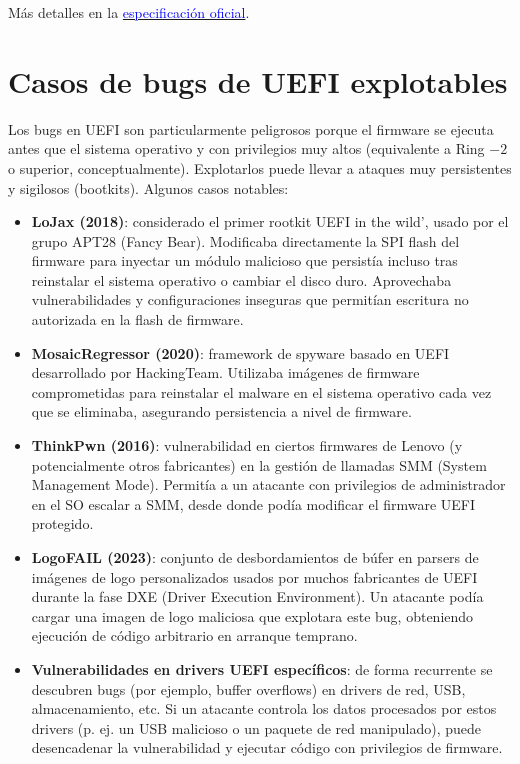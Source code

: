 \noindent Más detalles en la
\href{https://uefi.org/specs/UEFI/2.10/08_Services_Runtime_Services.html}%
      {\textcolor{blue}{especificación oficial}}.

\newpage

\section{Casos de bugs de UEFI explotables}
Los bugs en UEFI son particularmente peligrosos porque el firmware se ejecuta antes que el sistema operativo y con privilegios muy altos (equivalente a Ring $-2$ o superior, conceptualmente). Explotarlos puede llevar a ataques muy persistentes y sigilosos (bootkits). Algunos casos notables:

\begin{itemize}[noitemsep]
  \item \textbf{LoJax (2018)}: considerado el primer rootkit UEFI in the wild', usado por el grupo APT28 (Fancy Bear). Modificaba directamente la SPI flash del firmware para inyectar un módulo malicioso que persistía incluso tras reinstalar el sistema operativo o cambiar el disco duro. Aprovechaba vulnerabilidades y configuraciones inseguras que permitían escritura no autorizada en la flash de firmware.

  \item \textbf{MosaicRegressor (2020)}: framework de spyware basado en UEFI desarrollado por HackingTeam. Utilizaba imágenes de firmware comprometidas para reinstalar el malware en el sistema operativo cada vez que se eliminaba, asegurando persistencia a nivel de firmware.

  \item \textbf{ThinkPwn (2016)}: vulnerabilidad en ciertos firmwares de Lenovo (y potencialmente otros fabricantes) en la gestión de llamadas SMM (System Management Mode). Permitía a un atacante con privilegios de administrador en el SO escalar a SMM, desde donde podía modificar el firmware UEFI protegido.

  \item \textbf{LogoFAIL (2023)}: conjunto de desbordamientos de búfer en parsers de imágenes de logo personalizados usados por muchos fabricantes de UEFI durante la fase DXE (Driver Execution Environment). Un atacante podía cargar una imagen de logo maliciosa que explotara este bug, obteniendo ejecución de código arbitrario en arranque temprano.

  \item \textbf{Vulnerabilidades en drivers UEFI específicos}: de forma recurrente se descubren bugs (por ejemplo, buffer overflows) en drivers de red, USB, almacenamiento, etc. Si un atacante controla los datos procesados por estos drivers (p. ej. un USB malicioso o un paquete de red manipulado), puede desencadenar la vulnerabilidad y ejecutar código con privilegios de firmware.
\end{itemize}

